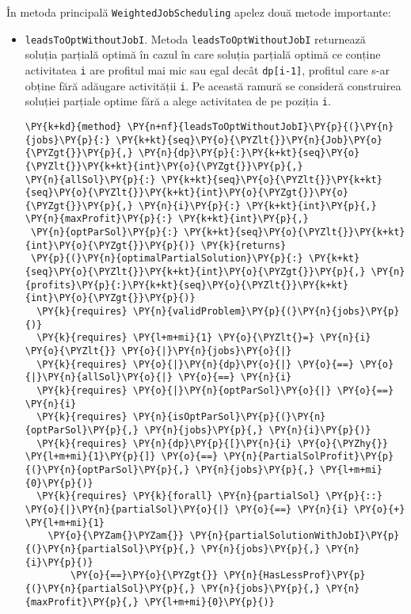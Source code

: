 În metoda principală \texttt{WeightedJobScheduling} apelez două metode importante:
\begin{itemize}
    \item\texttt{leadsToOptWithoutJobI}. Metoda \texttt{leadsToOptWithoutJobI} returnează \\soluția parțială optimă în cazul în care soluția parțială optimă ce conține activitatea \texttt{i}
    are profitul mai mic sau egal decât \texttt{dp[i-1]}, profitul care s-ar obține fără adăugare activității \texttt{i}. Pe această ramură se consideră construirea soluției parțiale optime fără a alege activitatea de pe poziția \texttt{i}.
    \begin{Verbatim}[commandchars=\\\{\},fontsize=\footnotesize]
\PY{k+kd}{method} \PY{n+nf}{leadsToOptWithoutJobI}\PY{p}{(}\PY{n}{jobs}\PY{p}{:} \PY{k+kt}{seq}\PY{o}{\PYZlt{}}\PY{n}{Job}\PY{o}{\PYZgt{}}\PY{p}{,} \PY{n}{dp}\PY{p}{:}\PY{k+kt}{seq}\PY{o}{\PYZlt{}}\PY{k+kt}{int}\PY{o}{\PYZgt{}}\PY{p}{,} 
\PY{n}{allSol}\PY{p}{:} \PY{k+kt}{seq}\PY{o}{\PYZlt{}}\PY{k+kt}{seq}\PY{o}{\PYZlt{}}\PY{k+kt}{int}\PY{o}{\PYZgt{}}\PY{o}{\PYZgt{}}\PY{p}{,} \PY{n}{i}\PY{p}{:} \PY{k+kt}{int}\PY{p}{,} \PY{n}{maxProfit}\PY{p}{:} \PY{k+kt}{int}\PY{p}{,}
 \PY{n}{optParSol}\PY{p}{:} \PY{k+kt}{seq}\PY{o}{\PYZlt{}}\PY{k+kt}{int}\PY{o}{\PYZgt{}}\PY{p}{)} \PY{k}{returns}
 \PY{p}{(}\PY{n}{optimalPartialSolution}\PY{p}{:} \PY{k+kt}{seq}\PY{o}{\PYZlt{}}\PY{k+kt}{int}\PY{o}{\PYZgt{}}\PY{p}{,} \PY{n}{profits}\PY{p}{:}\PY{k+kt}{seq}\PY{o}{\PYZlt{}}\PY{k+kt}{int}\PY{o}{\PYZgt{}}\PY{p}{)}
  \PY{k}{requires} \PY{n}{validProblem}\PY{p}{(}\PY{n}{jobs}\PY{p}{)}
  \PY{k}{requires} \PY{l+m+mi}{1} \PY{o}{\PYZlt{}=} \PY{n}{i} \PY{o}{\PYZlt{}} \PY{o}{|}\PY{n}{jobs}\PY{o}{|}
  \PY{k}{requires} \PY{o}{|}\PY{n}{dp}\PY{o}{|} \PY{o}{==} \PY{o}{|}\PY{n}{allSol}\PY{o}{|} \PY{o}{==} \PY{n}{i}
  \PY{k}{requires} \PY{o}{|}\PY{n}{optParSol}\PY{o}{|} \PY{o}{==} \PY{n}{i}
  \PY{k}{requires} \PY{n}{isOptParSol}\PY{p}{(}\PY{n}{optParSol}\PY{p}{,} \PY{n}{jobs}\PY{p}{,} \PY{n}{i}\PY{p}{)}
  \PY{k}{requires} \PY{n}{dp}\PY{p}{[}\PY{n}{i} \PY{o}{\PYZhy{}} \PY{l+m+mi}{1}\PY{p}{]} \PY{o}{==} \PY{n}{PartialSolProfit}\PY{p}{(}\PY{n}{optParSol}\PY{p}{,} \PY{n}{jobs}\PY{p}{,} \PY{l+m+mi}{0}\PY{p}{)}
  \PY{k}{requires} \PY{k}{forall} \PY{n}{partialSol} \PY{p}{::} \PY{o}{|}\PY{n}{partialSol}\PY{o}{|} \PY{o}{==} \PY{n}{i} \PY{o}{+} \PY{l+m+mi}{1}
    \PY{o}{\PYZam{}\PYZam{}} \PY{n}{partialSolutionWithJobI}\PY{p}{(}\PY{n}{partialSol}\PY{p}{,} \PY{n}{jobs}\PY{p}{,} \PY{n}{i}\PY{p}{)} 
        \PY{o}{==}\PY{o}{\PYZgt{}} \PY{n}{HasLessProf}\PY{p}{(}\PY{n}{partialSol}\PY{p}{,} \PY{n}{jobs}\PY{p}{,} \PY{n}{maxProfit}\PY{p}{,} \PY{l+m+mi}{0}\PY{p}{)}

\end{Verbatim}
\end{itemize}
